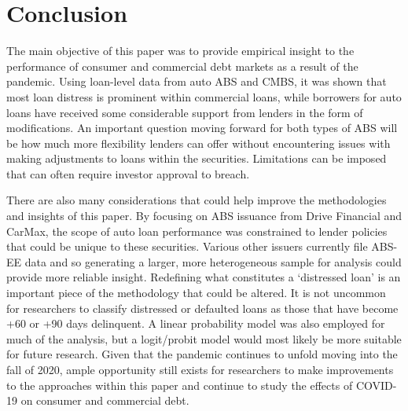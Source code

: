 \documentclass[10.5pt]{article}
\begin{document}
\section{Conclusion}

The main objective of this paper was to provide empirical insight to the performance of consumer and commercial debt markets as a result of the pandemic. Using loan-level data from auto ABS and CMBS, it was shown that most loan distress is prominent within commercial loans, while borrowers for auto loans have received some considerable support from lenders in the form of modifications. An important question moving forward for both types of ABS will be how much more flexibility lenders can offer without encountering issues with making adjustments to loans within the securities. Limitations can be imposed that can often require investor approval to breach. 

There are also many considerations that could help improve the methodologies and insights of this paper. By focusing on ABS issuance from Drive Financial and CarMax, the scope of auto loan performance was constrained to lender policies that could be unique to these securities. Various other issuers currently file ABS-EE data and so generating a larger, more heterogeneous sample for analysis could provide more reliable insight. Redefining what constitutes a `distressed loan' is an important piece of the methodology that could be altered. It is not uncommon for researchers to classify distressed or defaulted loans as those that have become +60 or +90 days delinquent. A linear probability model was also employed for much of the analysis, but a logit/probit model would most likely be more suitable for future research. Given that the pandemic continues to unfold moving into the fall of 2020, ample opportunity still exists for researchers to make improvements to the approaches within this paper and continue to study the effects of COVID-19 on consumer and commercial debt.
 
\end{document}
